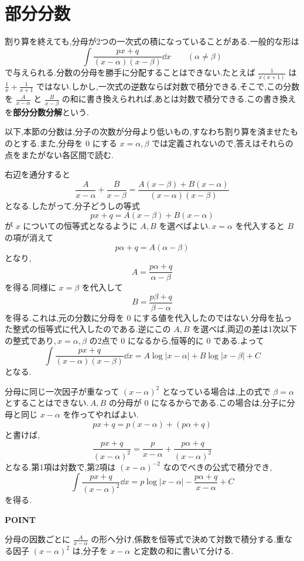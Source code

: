 \section{部分分数}\label{節:部分分数}

割り算を終えても,分母が2つの一次式の積になっていることがある.一般的な形は
\[
 \int\frac{px+q}{(x-\alpha)(x-\beta)}\dd x\qquad(\alpha\ne\beta)
\]
で与えられる.分数の分母を勝手に分配することはできない.たとえば $\frac1{x(x+1)}$ は $\frac1x+\frac1{x+1}$ ではない.しかし,一次式の逆数ならば対数で積分できる.そこで,この分数を $\frac A{x-\alpha}$ と $\frac B{x-\beta}$ の和に書き換えられれば,あとは対数で積分できる.この書き換えを\textbf{部分分数分解}という.

以下,本節の分数は,分子の次数が分母より低いもの,すなわち割り算を済ませたものとする.また,分母を $0$ にする $x=\alpha,\beta$ では定義されないので,答えはそれらの点をまたがない各区間で読む.

右辺を通分すると
\[
 \frac A{x-\alpha}+\frac B{x-\beta}
 =\frac{A(x-\beta)+B(x-\alpha)}{(x-\alpha)(x-\beta)}
\]
となる.したがって,分子どうしの等式
\[
 px+q=A(x-\beta)+B(x-\alpha)
\]
が $x$ についての恒等式となるように $A,B$ を選べばよい.\,$x=\alpha$ を代入すると $B$ の項が消えて
\[
 p\alpha+q=A(\alpha-\beta)
\]
となり,
\[
 A=\frac{p\alpha+q}{\alpha-\beta}
\]
を得る.同様に $x=\beta$ を代入して
\[
 B=\frac{p\beta+q}{\beta-\alpha}
\]
を得る.これは,元の分数に分母を $0$ にする値を代入したのではない.分母を払った整式の恒等式に代入したのである.逆にこの $A,B$ を選べば,両辺の差は1次以下の整式であり,\,$x=\alpha,\beta$ の2点で $0$ になるから,恒等的に $0$ である.よって
\[
 \int\frac{px+q}{(x-\alpha)(x-\beta)}\dd x
 =A\log|x-\alpha|+B\log|x-\beta|+C
\]
となる.

分母に同じ一次因子が重なって $(x-\alpha)^2$ となっている場合は,上の式で $\beta=\alpha$ とすることはできない.\,$A,B$ の分母が $0$ になるからである.この場合は,分子に分母と同じ $x-\alpha$ を作ってやればよい.
\[
 px+q=p(x-\alpha)+(p\alpha+q)
\]
と書けば,
\[
 \frac{px+q}{(x-\alpha)^2}
 =\frac p{x-\alpha}+\frac{p\alpha+q}{(x-\alpha)^2}
\]
となる.第1項は対数で,第2項は $(x-\alpha)^{-2}$ なのでべきの公式で積分でき,
\[
 \int\frac{px+q}{(x-\alpha)^2}\dd x
 =p\log|x-\alpha|-\frac{p\alpha+q}{x-\alpha}+C
\]
を得る.

\begin{bookpoint}
\textbf{POINT}\par
分母の因数ごとに $\frac A{x-\alpha}$ の形へ分け,係数を恒等式で決めて対数で積分する.重なる因子 $(x-\alpha)^2$ は,分子を $x-\alpha$ と定数の和に書いて分ける.
\end{bookpoint}

